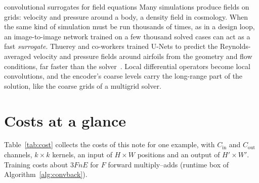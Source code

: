 \documentclass[11pt]{article}
\newcommand{\Cin}{C_{\mathrm{in}}}
\newcommand{\Cout}{C_{\mathrm{out}}}
\newcommand{\Hout}{H'}
\newcommand{\Wout}{W'}
\begin{document}
\begin{physics}{convolutional surrogates for field equations}
Many simulations produce fields on grids: velocity and pressure around a body, a density field in
cosmology. When the same kind of simulation must be run thousands of times, as in a design loop, an image-to-image network trained on a few thousand solved cases can act as a fast \emph{surrogate}.
Thuerey and co-workers trained U-Nets to predict the Reynolds-averaged velocity and pressure fields around airfoils from
the geometry and flow conditions, far faster than the solver~\cite{thuerey2020}. Local differential operators become local convolutions,
and the encoder's coarse levels carry the long-range part of the solution, like the coarse grids of a multigrid solver.
\end{physics}

\section{Costs at a glance}\label{sec:cost}

Table~\ref{tab:cost} collects the costs of this note for one example, with $\Cin$ and $\Cout$ channels, $k \times k$ kernels,
an input of $H \times W$ positions and an output of $\Hout \times \Wout$. Training costs about $3FnE$ for $F$ forward
multiply--adds (runtime box of Algorithm~\ref{alg:convback}).
\end{document}
